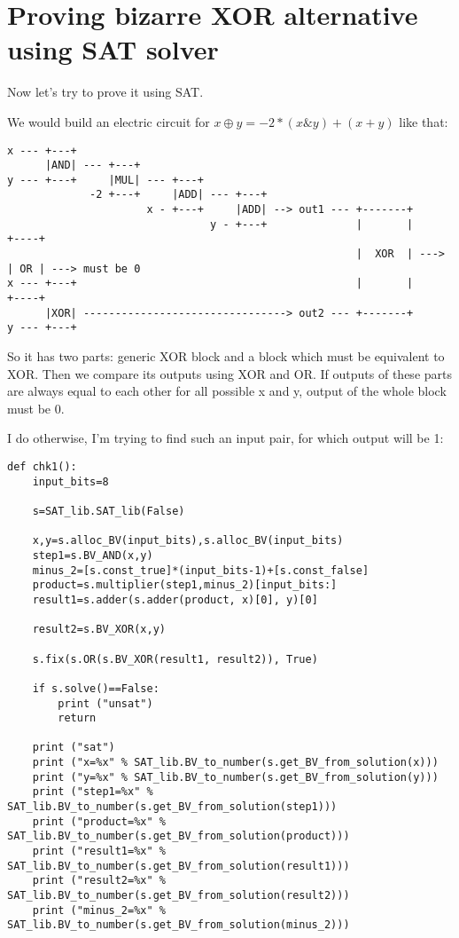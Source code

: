 \section{Proving bizarre XOR alternative using SAT solver}
\label{weird_XOR_SAT}

Now let's try to prove it using SAT.

We would build an electric circuit for $x \oplus y = -2*(x \& y) + (x + y)$ like that:

\begin{lstlisting}[basicstyle=\small]
x --- +---+
      |AND| --- +---+     
y --- +---+     |MUL| --- +---+
             -2 +---+     |ADD| --- +---+
                      x - +---+     |ADD| --> out1 --- +-------+
                                y - +---+              |       |      +----+
                                                       |  XOR  | ---> | OR | ---> must be 0
x --- +---+                                            |       |      +----+
      |XOR| --------------------------------> out2 --- +-------+
y --- +---+
\end{lstlisting}

So it has two parts: generic XOR block and a block which must be equivalent to XOR.
Then we compare its outputs using XOR and OR.
If outputs of these parts are always equal to each other for all possible x and y, output of the whole block must be 0.

I do otherwise, I'm trying to find such an input pair, for which output will be 1:

\begin{lstlisting}
def chk1():
    input_bits=8

    s=SAT_lib.SAT_lib(False)

    x,y=s.alloc_BV(input_bits),s.alloc_BV(input_bits)
    step1=s.BV_AND(x,y)
    minus_2=[s.const_true]*(input_bits-1)+[s.const_false]
    product=s.multiplier(step1,minus_2)[input_bits:]
    result1=s.adder(s.adder(product, x)[0], y)[0]

    result2=s.BV_XOR(x,y)

    s.fix(s.OR(s.BV_XOR(result1, result2)), True)

    if s.solve()==False:
        print ("unsat")
        return

    print ("sat")
    print ("x=%x" % SAT_lib.BV_to_number(s.get_BV_from_solution(x)))
    print ("y=%x" % SAT_lib.BV_to_number(s.get_BV_from_solution(y)))
    print ("step1=%x" % SAT_lib.BV_to_number(s.get_BV_from_solution(step1)))
    print ("product=%x" % SAT_lib.BV_to_number(s.get_BV_from_solution(product)))
    print ("result1=%x" % SAT_lib.BV_to_number(s.get_BV_from_solution(result1)))
    print ("result2=%x" % SAT_lib.BV_to_number(s.get_BV_from_solution(result2)))
    print ("minus_2=%x" % SAT_lib.BV_to_number(s.get_BV_from_solution(minus_2)))
\end{lstlisting}

